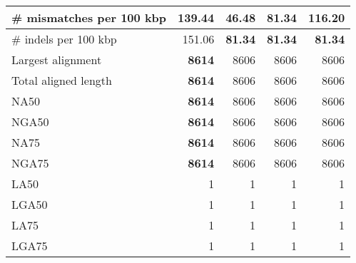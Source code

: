 \documentclass[12pt,a4paper]{article}
\begin{document}
\begin{table}[ht]
\begin{center}
\begin{tabular}{|l*{4}{|r}|}
\# mismatches per 100 kbp & 139.44 & {\bf 46.48} & 81.34 & 116.20 \\ \hline
\# indels per 100 kbp & 151.06 & {\bf 81.34} & {\bf 81.34} & {\bf 81.34} \\ \hline
Largest alignment & {\bf 8614} & 8606 & 8606 & 8606 \\ \hline
Total aligned length & {\bf 8614} & 8606 & 8606 & 8606 \\ \hline
NA50 & {\bf 8614} & 8606 & 8606 & 8606 \\ \hline
NGA50 & {\bf 8614} & 8606 & 8606 & 8606 \\ \hline
NA75 & {\bf 8614} & 8606 & 8606 & 8606 \\ \hline
NGA75 & {\bf 8614} & 8606 & 8606 & 8606 \\ \hline
LA50 & 1 & 1 & 1 & 1 \\ \hline
LGA50 & 1 & 1 & 1 & 1 \\ \hline
LA75 & 1 & 1 & 1 & 1 \\ \hline
LGA75 & 1 & 1 & 1 & 1 \\ \hline
\end{tabular}
\end{center}
\end{table}
\end{document}
